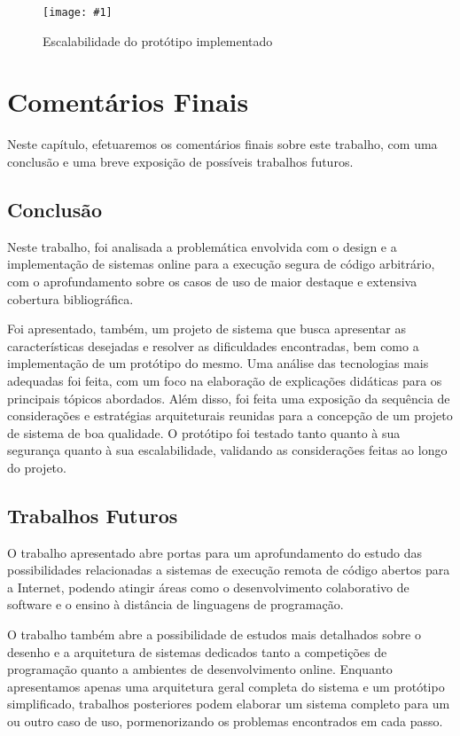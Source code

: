 \documentclass[ruledheader, 12pt]{abnt}
\newcommand{\figcustom}[4]{\par
	\begin{figure}[#3]
		\centering
		\texttt{[image: \#1]}
		\caption{\label{fig:#1}#2}
	\end{figure}
\par}
\begin{document}
\figcustom{scale}{Escalabilidade do protótipo implementado}{p}{1}

\chapter{Comentários Finais}

Neste capítulo, efetuaremos os comentários finais sobre este trabalho, com uma conclusão e uma breve exposição de possíveis trabalhos futuros.

\section{Conclusão}

Neste trabalho, foi analisada a problemática envolvida com o design e a implementação de sistemas online para a execução segura de código arbitrário, com o aprofundamento sobre os casos de uso de maior destaque e extensiva cobertura bibliográfica.

Foi apresentado, também, um projeto de sistema que busca apresentar as características desejadas e resolver as dificuldades encontradas, bem como a implementação de um protótipo do mesmo. Uma análise das tecnologias mais adequadas foi feita, com um foco na elaboração de explicações didáticas para os principais tópicos abordados. Além disso, foi feita uma exposição da sequência de considerações e estratégias arquiteturais reunidas para a concepção de um projeto de sistema de boa qualidade. O protótipo foi testado tanto quanto à sua segurança quanto à sua escalabilidade, validando as considerações feitas ao longo do projeto.

\section{Trabalhos Futuros}

O trabalho apresentado abre portas para um aprofundamento do estudo das possibilidades relacionadas a sistemas de execução remota de código abertos para a Internet, podendo atingir áreas como o desenvolvimento colaborativo de software e o ensino à distância de linguagens de programação.

O trabalho também abre a possibilidade de estudos mais detalhados sobre o desenho e a arquitetura de sistemas dedicados tanto a competições de programação quanto a ambientes de desenvolvimento online. Enquanto apresentamos apenas uma arquitetura geral completa do sistema e um protótipo simplificado, trabalhos posteriores podem elaborar um sistema completo para um ou outro caso de uso, pormenorizando os problemas encontrados em cada passo.






\end{document}
